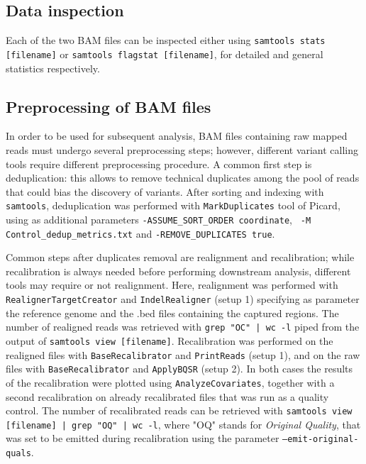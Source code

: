\documentclass[11pt]{article}
\begin{document}
\subsection*{Data inspection}

Each of the two BAM files can be inspected either using \texttt{samtools stats [filename]} or \texttt{samtools flagstat [filename]}, for detailed and general statistics respectively. 


\subsection*{Preprocessing of BAM files}

In order to be used for subsequent analysis, BAM files containing raw mapped reads must undergo several preprocessing steps; however, different variant calling tools require different preprocessing procedure. A common first step is deduplication: this allows to remove technical duplicates among the pool of reads that could bias the discovery of variants. 
After sorting and indexing with \texttt{samtools}, deduplication was performed with \texttt{MarkDuplicates} tool of Picard, using as additional parameters \texttt{-ASSUME\_SORT\_ORDER coordinate}, \texttt{ -M Control\_dedup\_metrics.txt} and \texttt{-REMOVE\_DUPLICATES true}.

Common steps after duplicates removal are realignment and recalibration; while recalibration is always needed before performing downstream analysis, different tools may require or not realignment. Here, realignment was performed with \texttt{RealignerTargetCreator} and \texttt{IndelRealigner} (setup 1) specifying as parameter the reference genome and the .bed files containing the captured regions.
The number of realigned reads was retrieved with \texttt{grep "OC" | wc -l} piped from the output of \texttt{samtools view [filename]}.
Recalibration was performed on the realigned files with \texttt{BaseRecalibrator} and \texttt{PrintReads} (setup 1), and on the raw files with \texttt{BaseRecalibrator} and \texttt{ApplyBQSR} (setup 2). In both cases the results of the recalibration were plotted using \texttt{AnalyzeCovariates}, together with a second recalibration on already recalibrated files that was run as a quality control.
The number of recalibrated reads can be retrieved with \texttt{samtools view [filename] | grep "OQ" | wc -l}, where "OQ" stands for \emph{Original Quality}, that was set to be emitted during recalibration using the parameter \texttt{--emit-original-quals}.
\end{document}
